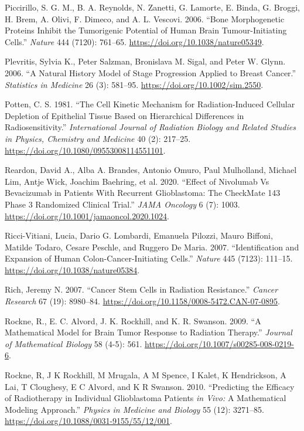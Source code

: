 \documentclass[
  default,
]{sn-jnl}
\newlength{\cslhangindent}
\newenvironment{CSLReferences}[2] %
 {\begin{list}{}{%
  \setlength{\itemindent}{0pt}
  \setlength{\leftmargin}{0pt}
  \setlength{\parsep}{0pt}
  \ifodd #1
   \setlength{\leftmargin}{\cslhangindent}
   \setlength{\itemindent}{-1\cslhangindent}
  \fi
  \setlength{\itemsep}{#2\baselineskip}}}
 {\end{list}}
\begin{document}
\begin{CSLReferences}{1}{0}
Piccirillo, S. G. M., B. A. Reynolds, N. Zanetti, G. Lamorte, E. Binda,
G. Broggi, H. Brem, A. Olivi, F. Dimeco, and A. L. Vescovi. 2006.
{``Bone Morphogenetic Proteins Inhibit the Tumorigenic Potential of
Human Brain Tumour-Initiating Cells.''} \emph{Nature} 444 (7120):
761--65. \url{https://doi.org/10.1038/nature05349}.

Plevritis, Sylvia K., Peter Salzman, Bronislava M. Sigal, and Peter W.
Glynn. 2006. {``A Natural History Model of Stage Progression Applied to
Breast Cancer.''} \emph{Statistics in Medicine} 26 (3): 581--95.
\url{https://doi.org/10.1002/sim.2550}.

Potten, C. S. 1981. {``The Cell Kinetic Mechanism for Radiation-Induced
Cellular Depletion of Epithelial Tissue Based on Hierarchical
Differences in Radiosensitivity.''} \emph{International Journal of
Radiation Biology and Related Studies in Physics, Chemistry and
Medicine} 40 (2): 217--25.
\url{https://doi.org/10.1080/09553008114551101}.

Reardon, David A., Alba A. Brandes, Antonio Omuro, Paul Mulholland,
Michael Lim, Antje Wick, Joachim Baehring, et al. 2020. {``Effect of
Nivolumab Vs Bevacizumab in Patients With Recurrent Glioblastoma: The
CheckMate 143 Phase 3 Randomized Clinical Trial.''} \emph{JAMA Oncology}
6 (7): 1003. \url{https://doi.org/10.1001/jamaoncol.2020.1024}.

Ricci-Vitiani, Lucia, Dario G. Lombardi, Emanuela Pilozzi, Mauro
Biffoni, Matilde Todaro, Cesare Peschle, and Ruggero De Maria. 2007.
{``Identification and Expansion of Human Colon-Cancer-Initiating
Cells.''} \emph{Nature} 445 (7123): 111--15.
\url{https://doi.org/10.1038/nature05384}.

Rich, Jeremy N. 2007. {``Cancer Stem Cells in Radiation Resistance.''}
\emph{Cancer Research} 67 (19): 8980--84.
\url{https://doi.org/10.1158/0008-5472.CAN-07-0895}.

Rockne, R., E. C. Alvord, J. K. Rockhill, and K. R. Swanson. 2009. {``A
Mathematical Model for Brain Tumor Response to Radiation Therapy.''}
\emph{Journal of Mathematical Biology} 58 (4-5): 561.
\url{https://doi.org/10.1007/s00285-008-0219-6}.

Rockne, R, J K Rockhill, M Mrugala, A M Spence, I Kalet, K Hendrickson,
A Lai, T Cloughesy, E C Alvord, and K R Swanson. 2010. {``Predicting the
Efficacy of Radiotherapy in Individual Glioblastoma Patients {\emph{in
Vivo:}} A Mathematical Modeling Approach.''} \emph{Physics in Medicine
and Biology} 55 (12): 3271--85.
\url{https://doi.org/10.1088/0031-9155/55/12/001}.


\end{CSLReferences}
\end{document}
